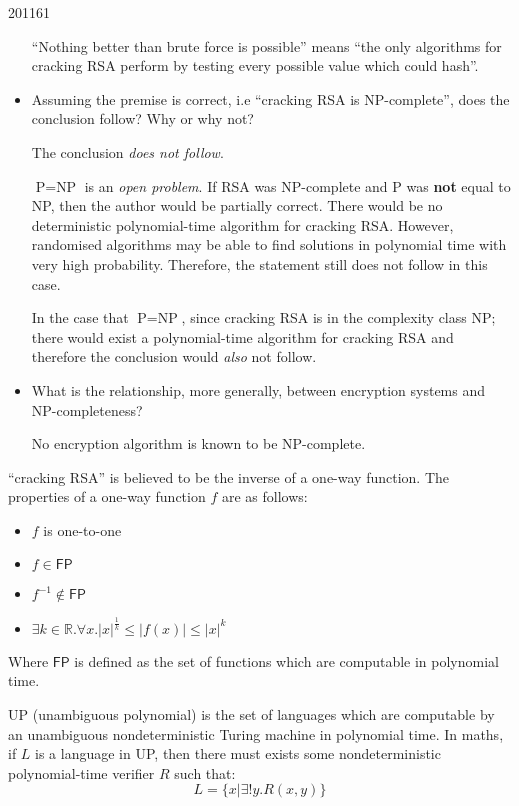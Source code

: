 \documentclass[10pt,\jkfside,a4paper]{article}
\begin{document}
\begin{examquestion}{2011}{6}{1}
\begin{itemize}
``Nothing better than brute force is possible'' means ``the only algorithms
for cracking RSA perform by testing every possible value which could hash''.

\item Assuming the premise is correct, i.e ``cracking RSA is NP-complete'',
does the conclusion follow? Why or why not?

The conclusion \textit{does not follow}.

$\text{P} = \text{NP}$ is an \textit{open problem}. If RSA was NP-complete
and P was \textbf{not} equal to NP, then the author would be partially
correct. There would be no deterministic polynomial-time algorithm for
cracking RSA\@. However, randomised algorithms may be able to find
solutions in polynomial time with very high probability. Therefore, the
statement still does not follow in this case.

In the case that $\text{P} = \text{NP}$, since cracking RSA is in the
complexity class NP; there would exist a polynomial-time algorithm for
cracking RSA and therefore the conclusion would \textit{also} not follow.

\item What is the relationship, more generally, between encryption systems
and NP-completeness?

No encryption algorithm is known to be NP-complete.

\end{itemize}

``cracking RSA'' is believed to be the inverse of a one-way function. The
properties of a one-way function $f$ are as follows:
\begin{itemize}

\item $f$ is one-to-one

\item $f \in \mathsf{FP}$

\item $f^{-1} \notin \mathsf{FP}$

\item $\exists k \in \mathbb{R}. \forall x. |x|^{\frac{1}{k}} \le |f(x)| \le
|x|^k$

\end{itemize}

Where $\mathsf{FP}$ is defined as the set of functions which are computable
in polynomial time.

UP (unambiguous polynomial) is the set of languages which are computable by
an unambiguous nondeterministic Turing machine in polynomial time. In maths,
if $L$ is a language in UP, then there must exists some nondeterministic
polynomial-time verifier $R$ such that:
\[
L = \{x|\exists! y. R(x, y)\}
\]


\end{examquestion}
\end{document}
